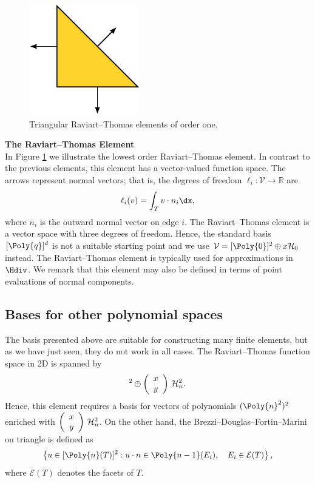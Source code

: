 \begin{figure}
  \centering
  \includegraphics[width=\smallfig]{chapters/kirby-6/pdf/RT0.pdf}
  \caption{Triangular Raviart--Thomas elements of order one.}
  \label{RaviartThomas}
\end{figure}

\begin{example}{\bf{The Raviart--Thomas Element}} \\
In Figure \ref{RaviartThomas} we illustrate the lowest order
Raviart--Thomas element.  In contrast to the previous elements, this
element has a vector-valued function space.  The arrows represent normal
vectors; that is, the degrees of freedom $\ell_i : \mathcal{V} \rightarrow
\mathbb{R}$ are
\begin{equation}
\ell_i ( v) = \int_{T} v \cdot n_i  \dx ,
\end{equation}
where $n_i$ is the outward normal vector on edge $i$.  The Raviart--Thomas
element is a vector space with three degrees of freedom. Hence, the
standard basis $[\Poly{q}]^d$ is not a suitable starting point and we use
$\mathcal{V} = [\Poly{0}]^2 \oplus x \H_0$ instead.  The Raviart--Thomas
element is typically used for approximations in $\Hdiv$.  We remark
that this element may also be defined in terms of point evaluations of
normal components.
\end{example}

\subsection{Bases for other polynomial spaces}
The basis presented above are suitable for constructing many finite
elements, but as we have just seen, they do not work in all cases.
The Raviart--Thomas function space in 2D is spanned by
\begin{equation}
[\Poly{n}]^2 \oplus
\left(\begin{array}{c} x \\y \end{array} \right) \, \H^2_n.
\end{equation}
Hence, this element requires a basis for vectors of polynomials
$(\Poly{n}^2)^2$ enriched with $\left(\begin{array}{c} x \\y \end{array}
\right) \, {\mathcal{H}}^2_n$.  On the other hand, the Brezzi--Douglas--Fortin--Marini
on triangle is defined as
\begin{equation}
\left\{
u \in [\Poly{n}(T)]^2 : u \cdot n \in \Poly{n-1}(E_i), \quad E_i \in \mathcal{E}(T)
\right\},
\end{equation}
where $\mathcal{E}(T)$ denotes the facets of $T$.

